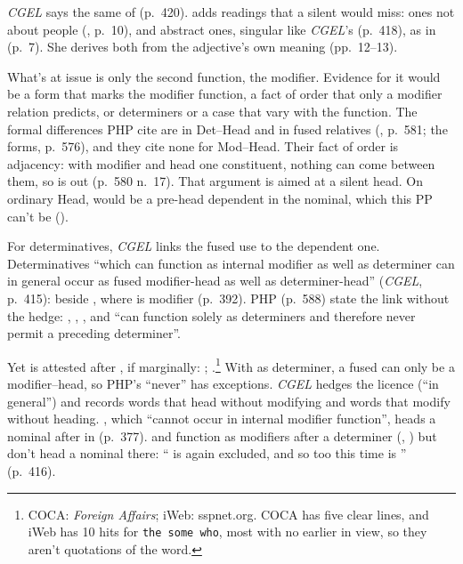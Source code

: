 \textit{CGEL} says the same of  (p.~420). \textcite{glass2019} adds readings that a silent  would miss: ones not about people (, p.~10), and abstract ones, singular like \textit{CGEL}'s  (p.~418), as in  (p.~7). She derives both from the adjective's own meaning (pp.~12--13).

What's at issue is only the second function, the modifier. Evidence for it would be a form that marks the modifier function, a fact of order that only a modifier relation predicts, or determiners or a case that vary with the function. The formal differences PHP cite are in Det--Head and in fused relatives (, p.~581; the  forms, p.~576), and they cite none for Mod--Head. Their fact of order is adjacency: with modifier and head one constituent, nothing can come between them, so  is out (p.~580 n.~17). That argument is aimed at a silent head. On ordinary Head,  would be a pre-head dependent in the nominal, which this PP can't be ().

For determinatives, \textit{CGEL} links the fused use to the dependent one. Determinatives \enquote{which can function as internal modifier as well as determiner can in general occur as fused modifier-head as well as determiner-head} (\textit{CGEL}, p.~415):  beside , where  is modifier (p.~392). PHP (p.~588) state the link without the hedge: , , , and  \enquote{can function solely as determiners and therefore never permit a preceding determiner}.

Yet  is attested after , if marginally: ; .\footnote{COCA: \textit{Foreign Affairs}; iWeb: sspnet.org. COCA has five clear lines, and iWeb has 10 hits for \texttt{the some who}, most with no earlier  in view, so they aren't quotations of the word.} With  as determiner, a fused  can only be a modifier--head, so PHP's \enquote{never} has  exceptions. \textit{CGEL} hedges the licence (\enquote{in general}) and records words that head without modifying and words that modify without heading. , which \enquote{cannot occur in internal modifier function}, heads a nominal after  in \judgmark{\%} (p.~377).  and  function as modifiers after a determiner (, ) but don't head a nominal there: \enquote{ is again excluded, and so too this time is } (p.~416).

